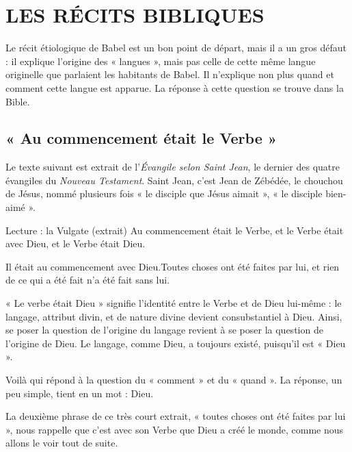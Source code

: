 \section{LES RÉCITS BIBLIQUES}
Le récit étiologique de Babel est un bon point de départ, mais il a un gros défaut : il explique l’origine des
« langues », mais pas celle de cette même langue originelle que parlaient les habitants de Babel. Il n’explique non plus quand et comment cette langue est apparue. La réponse à cette question se trouve dans la Bible.

\subsection{« Au commencement était le Verbe »}
Le texte suivant est extrait de l’\textit{Évangile selon Saint Jean}, le dernier des quatre évangiles du \textit{Nouveau Testament}. Saint Jean, c’est Jean de Zébédée, le chouchou de Jésus, nommé plusieurs fois « le disciple que Jésus aimait », « le disciple bien-aimé ».
\begin{lecture}{Lecture : la Vulgate (extrait)}
Au commencement était le Verbe, et le Verbe était avec Dieu, et le Verbe était Dieu.\par
Il était au commencement avec Dieu.Toutes choses ont été faites par lui, et rien de ce qui a été fait n’a été fait sans lui.
\end{lecture}
« Le verbe était Dieu » signifie l’identité entre le Verbe et de Dieu lui-même : le langage, attribut divin, et de nature divine devient consubstantiel à Dieu. Ainsi, se poser la question de l’origine du langage revient à se poser la question de l’origine de Dieu. Le langage, comme Dieu, a toujours existé, puisqu’il est « Dieu ».

Voilà qui répond à la question du « comment » et du « quand ». La réponse, un peu simple, tient en un mot : Dieu.

La deuxième phrase de ce très court extrait, « toutes choses ont été faites par lui », nous rappelle que c’est avec son Verbe que Dieu a créé le monde, comme nous allons le voir tout de suite.

